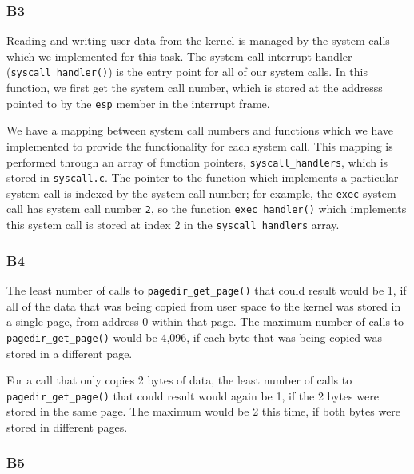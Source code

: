 \documentclass[a4wide, 11pt]{article}
\newcommand{\tx}{\texttt}
\begin{document}
\subsubsection{B3}

Reading and writing user data from the kernel is managed by the system calls which we implemented for this task. The system call interrupt handler (\tx{syscall\_handler()}) is the entry point for all of our system calls. In this function, we first get the system call number, which is stored at the addresss pointed to by the \tx{esp} member in the interrupt frame.

We have a mapping between system call numbers and functions which we have implemented to provide the functionality for each system call. This mapping is performed through an array of function pointers, \tx{syscall\_handlers}, which is stored in \tx{syscall.c}. The pointer to the function which implements a particular system call is indexed by the system call number; for example, the \tx{exec} system call has system call number \tx{2}, so the function \tx{exec\_handler()} which implements this system call is stored at index 2 in the \tx{syscall\_handlers} array.

\subsubsection{B4}

The least number of calls to \tx{pagedir\_get\_page()} that could result would be 1, if all of the data that was being copied from user space to the kernel was stored in a single page, from address 0 within that page. The maximum number of calls to \tx{pagedir\_get\_page()} would be 4,096, if each byte that was being copied was stored in a different page.

For a call that only copies 2 bytes of data, the least number of calls to \tx{pagedir\_get\_page()} that could result would again be 1, if the 2 bytes were stored in the same page. The maximum would be 2 this time, if both bytes were stored in different pages.

\subsubsection{B5}
\end{document}
